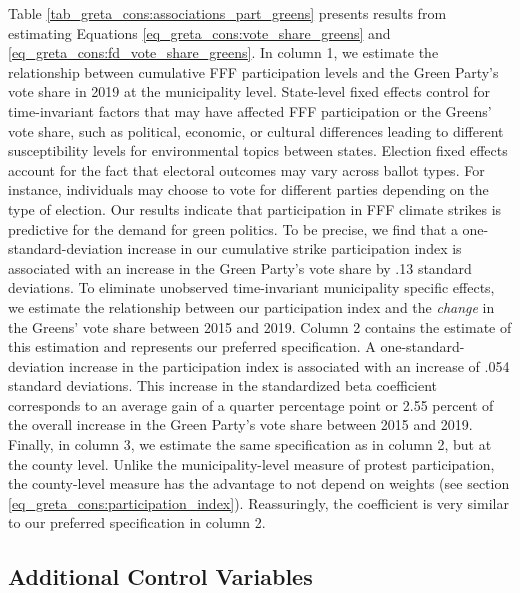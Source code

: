 Table \ref{tab_greta_cons:associations_part_greens} presents results from estimating Equations \ref{eq_greta_cons:vote_share_greens} and \ref{eq_greta_cons:fd_vote_share_greens}. In column 1, we estimate the relationship between cumulative FFF participation levels and the Green Party's vote share in 2019 at the municipality level. State-level fixed effects control for time-invariant factors that may have affected FFF participation or the Greens' vote share, such as political, economic, or cultural differences leading to different susceptibility levels for environmental topics between states. Election fixed effects account for the fact that electoral outcomes may vary across ballot types. For instance, individuals may choose to vote for different parties depending on the type of election. Our results indicate that participation in FFF climate strikes is predictive for the demand for green politics. To be precise, we find that a one-standard-deviation increase in our cumulative strike participation index is associated with an increase in the Green Party's vote share by .13 standard deviations. To eliminate unobserved time-invariant municipality specific effects, we estimate the relationship between our participation index and the \emph{change} in the Greens' vote share between 2015 and 2019. Column 2 contains the estimate of this estimation and represents our preferred specification. A one-standard-deviation increase in the participation index is associated with an increase of .054 standard deviations. This increase in the standardized beta coefficient corresponds to an average gain of a quarter percentage point or 2.55 percent of the overall increase in the Green Party's vote share between 2015 and 2019. Finally, in column 3, we estimate the same specification as in column 2, but at the county level. Unlike the municipality-level measure of protest participation, the county-level measure has the advantage to not depend on weights (see section \ref*{eq_greta_cons:participation_index}). Reassuringly, the coefficient is very similar to our preferred specification in column 2.





\subsection{Additional Control Variables}

